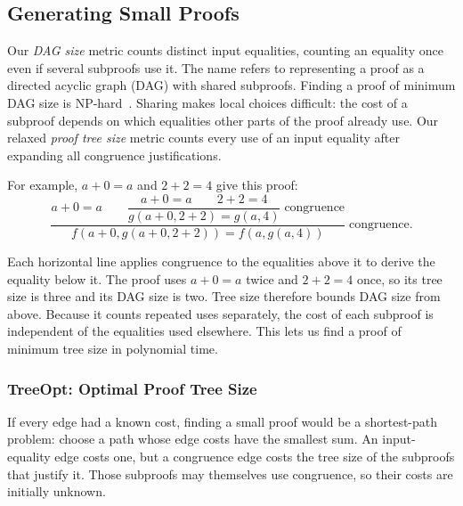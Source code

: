 \subsection{Generating Small Proofs}
\label{sec:small-proofs}

Our \emph{DAG size} metric counts distinct input equalities,
  counting an equality once even if several subproofs use it.
The name refers to representing a proof as a directed acyclic graph (DAG) with shared subproofs.
Finding a proof of minimum DAG size is NP-hard~\cite{small-conflict}.
Sharing makes local choices difficult: the cost of a subproof depends on
  which equalities other parts of the proof already use.
Our relaxed \emph{proof tree size} metric counts every use of an input equality
  after expanding all congruence justifications.

\begin{samepage}
For example, $a+0=a$ and $2+2=4$ give this proof:
\[
  \dfrac{
    a+0=a
    \qquad
    \dfrac{a+0=a\qquad 2+2=4}{g(a+0,2+2)=g(a,4)}\;\text{congruence}
  }{f(a+0,g(a+0,2+2))=f(a,g(a,4))}\;\text{congruence}.
\]
\end{samepage}
Each horizontal line applies congruence to the equalities above it to derive the equality below it.
The proof uses $a+0=a$ twice and $2+2=4$ once, so its tree size is three and its DAG size is two.
Tree size therefore bounds DAG size from above.
Because it counts repeated uses separately, the cost of each subproof
  is independent of the equalities used elsewhere.
This lets us find a proof of minimum tree size in polynomial time.

\subsubsection{TreeOpt: Optimal Proof Tree Size}
\label{sec:treeopt}

If every edge had a known cost, finding a small proof would be a shortest-path problem:
  choose a path whose edge costs have the smallest sum.
An input-equality edge costs one, but a congruence edge costs the tree size
  of the subproofs that justify it.
Those subproofs may themselves use congruence,
  so their costs are initially unknown.

